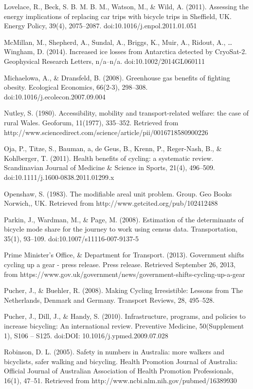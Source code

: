 Lovelace, R., Beck, S. B. M. B. M., Watson, M., \& Wild, A. (2011).
Assessing the energy implications of replacing car trips with bicycle
trips in Sheffield, UK. Energy Policy, 39(4), 2075--2087.
doi:10.1016/j.enpol.2011.01.051

McMillan, M., Shepherd, A., Sundal, A., Briggs, K., Muir, A., Ridout,
A., \ldots{} Wingham, D. (2014). Increased ice losses from Antarctica
detected by CryoSat-2. Geophysical Research Letters, n/a--n/a.
doi:10.1002/2014GL060111

Michaelowa, A., \& Dransfeld, B. (2008). Greenhouse gas benefits of
fighting obesity. Ecological Economics, 66(2-3), 298--308.
doi:10.1016/j.ecolecon.2007.09.004

Nutley, S. (1980). Accessibility, mobility and transport-related
welfare: the case of rural Wales. Geoforum, 11(1977), 335--352.
Retrieved from
http://www.sciencedirect.com/science/article/pii/0016718580900226

Oja, P., Titze, S., Bauman, a, de Geus, B., Krenn, P., Reger-Nash, B.,
\& Kohlberger, T. (2011). Health benefits of cycling: a systematic
review. Scandinavian Journal of Medicine \& Science in Sports, 21(4),
496--509. doi:10.1111/j.1600-0838.2011.01299.x

Openshaw, S. (1983). The modifiable areal unit problem. Group. Geo Books
Norwich,, UK. Retrieved from http://www.getcited.org/pub/102412488

Parkin, J., Wardman, M., \& Page, M. (2008). Estimation of the
determinants of bicycle mode share for the journey to work using census
data. Transportation, 35(1), 93--109. doi:10.1007/s11116-007-9137-5

Prime Minister's Office, \& Department for Transport. (2013). Government
shifts cycling up a gear - press release. Press release. Retrieved
September 26, 2013, from
https://www.gov.uk/government/news/government-shifts-cycling-up-a-gear

Pucher, J., \& Buehler, R. (2008). Making Cycling Irresistible: Lessons
from The Netherlands, Denmark and Germany. Transport Reviews, 28,
495--528.

Pucher, J., Dill, J., \& Handy, S. (2010). Infrastructure, programs, and
policies to increase bicycling: An international review. Preventive
Medicine, 50(Supplement 1), S106 -- S125. doi:DOI:
10.1016/j.ypmed.2009.07.028

Robinson, D. L. (2005). Safety in numbers in Australia: more walkers and
bicyclists, safer walking and bicycling. Health Promotion Journal of
Australia: Official Journal of Australian Association of Health
Promotion Professionals, 16(1), 47--51. Retrieved from
http://www.ncbi.nlm.nih.gov/pubmed/16389930

